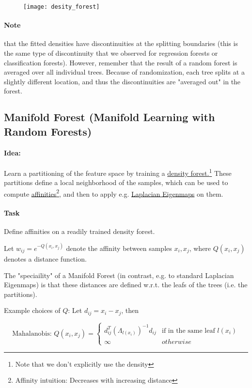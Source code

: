 \begin{figure}[H]
  \centering
  \texttt{[image: desity\_forest]}
\end{figure}

\paragraph{Note} that the fitted densities have discontinuities at the splitting boundaries (this is the same type of discontinuity that we observed for regression forests or classification forests). However, remember that the result of a random forest is averaged over all individual trees. Because of randomization, each tree splits at a slightly different location, and thus the discontinuities are "averaged out" in the forest.

\newpage
\subsection*{Manifold Forest (Manifold Learning with Random Forests)}
\paragraph{Idea:} Learn a partitioning of the feature space by training a \underline{density forest.}\footnote{Note that we don't explicitly use the density} These partitions define a local neighborhood of the samples, which can be used to compute \underline{affinities}\footnote{Affinity intuition: Decreases with increasing distance}, and then to apply e.g. \underline{Laplacian Eigenmaps} on them.

\paragraph{Task} Define affinities on a readily trained density forest.

Let \(w_{ij} = e^{-Q(x_i, x_j)}\) denote the affinity between samples \(x_i,x_j\), where \(Q(x_i, x_j)\) denotes a distance function.

The "speciaility" of a Manifold Forest (in contrast, e.g. to standard Laplacian Eigenmaps) is that these distances are defined w.r.t. the leafs of the trees (i.e. the partitions).

\bigbreak

Example choices of \(Q\): Let \(d_{ij} = x_i - x_j\), then

\[\text{Mahalanobis: } Q(x_i, x_j) = \begin{cases} d_{ij}^T(\Lambda_{l(x_i)})^{-1} d_{ij} & \text{if in the same leaf } l(x_i) \\ \infty & otherwise \end{cases}\]

